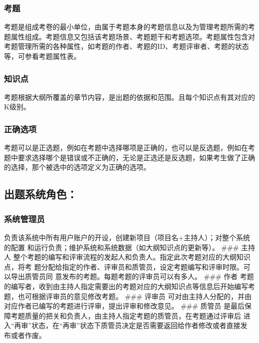 \documentclass[hyperref, a4paper]{ctexart}
\begin{document}
\hypertarget{ux8003ux9898}{%
\subsubsection{考题}\label{ux8003ux9898}}

考题是组成考卷的最小单位，由属于考题本身的考题信息以及为管理考题所需的考题属性组成。考题信息又包括该考题场景、考题题干和考题选项。考题属性包含对考题管理所需的各种属性，如考题的作者、考题的ID、考题评审者、考题的状态等，可参看考题属性表。

\hypertarget{ux77e5ux8bc6ux70b9}{%
\subsubsection{知识点}\label{ux77e5ux8bc6ux70b9}}

考题根据大纲所覆盖的章节内容，是出题的依据和范围。且每个知识点有其对应的K级别。

\hypertarget{ux6b63ux786eux9009ux9879}{%
\subsubsection{正确选项}\label{ux6b63ux786eux9009ux9879}}

考题可以是正选题，例如在考题中选择哪项是正确的，也可以是反选题，例如在考题中要求选择哪个是错误或不正确的，无论是正选还是反选题，如果考生做了正确的选择，那个被选中的选项定义为正确的选项。

\hypertarget{ux51faux9898ux7cfbux7edfux89d2ux8272}{%
\subsection{出题系统角色：}\label{ux51faux9898ux7cfbux7edfux89d2ux8272}}

\hypertarget{ux7cfbux7edfux7ba1ux7406ux5458}{%
\subsubsection{系统管理员}\label{ux7cfbux7edfux7ba1ux7406ux5458}}

负责该系统中所有用户账户的开设，创建新项目（项目名+主持人）；对整个系统的配置
和运行负责；维护系统和系统数据（如大纲知识点的更新等）。 \#\#\# 主持人
整个考题的编写和评审流程的发起人和负责人。指定此次考题对应的大纲知识点，将考
题分配给指定的作者、评审员和质管员，设定考题编写和评审时限。可以导出质管员同
意发布的考题。每题考题的评审员可以有多人。 \#\#\# 作者
考题的编写者，收到由主持人指定需要出的考题对应的大纲知识点等信息后开始编写考
题，也可根据评审员的意见修改考题。 \#\#\# 评审员
可对由主持人分配的，并由对应作者已编写的考题进行评审，提出评审和修改意见。
\#\#\# 质管员
是最后保障考题质量的把关和负责人，由主持人指定考题的质管员，在考题通过评审后
进入``再审''状态，在``再审''状态下质管员决定是否需要返回给作者修改或者直接发
布或者作废。
\end{document}
